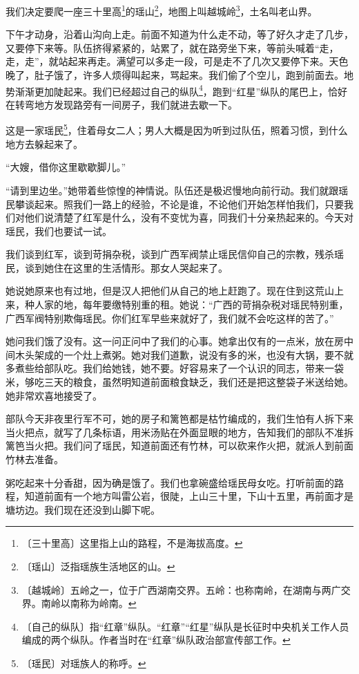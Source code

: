 \documentclass[12pt,UTF-8,openany]{ctexbook}
\begin{document}
\begin{large}
    
    我们决定要爬一座三十里高\footnote{〔三十里高〕这里指上山的路程，不是海拔高度。}的瑶山\footnote{〔瑶山〕泛指瑶族生活地区的山。}，地图上叫越城岭\footnote{〔越城岭〕五岭之一，位于广西湖南交界。五岭：也称南岭，在湖南与两广交界。南岭以南称为岭南。}，土名叫老山界。
    
    下午才动身，沿着山沟向上走。前面不知道为什么走不动，等了好久才走了几步，又要停下来等。队伍挤得紧紧的，站累了，就在路旁坐下来，等前头喊着“走，走，走”，就站起来再走。满望可以多走一段，可是走不了几次又要停下来。天色晚了，肚子饿了，许多人烦得叫起来，骂起来。我们偷了个空儿，跑到前面去。地势渐渐更加陡起来。我们已经超过自己的纵队\footnote{〔自己的纵队〕指“红章”纵队。“红章”“红星”纵队是长征时中央机关工作人员编成的两个纵队。作者当时在“红章”纵队政治部宣传部工作。}，跑到“红星”纵队的尾巴上，恰好在转弯地方发现路旁有一间房子，我们就进去歇一下。
    
    这是一家瑶民\footnote{〔瑶民〕对瑶族人的称呼。}，住着母女二人；男人大概是因为听到过队伍，照着习惯，到什么地方去躲起来了。
    
    “大嫂，借你这里歇歇脚儿。”
    
    “请到里边坐。”她带着些惊惶的神情说。队伍还是极迟慢地向前行动。我们就跟瑶民攀谈起来。照我们一路上的经验，不论是谁，不论他们开始怎样怕我们，只要我们对他们说清楚了红军是什么，没有不变忧为喜，同我们十分亲热起来的。今天对瑶民，我们也要试一试。
    
    我们谈到红军，谈到苛捐杂税，谈到广西军阀禁止瑶民信仰自己的宗教，残杀瑶民，谈到她住在这里的生活情形。那女人哭起来了。
    
    她说她原来也有过地，但是汉人把他们从自己的地上赶跑了。现在住到这荒山上来，种人家的地，每年要缴特别重的租。她说：“广西的苛捐杂税对瑶民特别重，广西军阀特别欺侮瑶民。你们红军早些来就好了，我们就不会吃这样的苦了。”
    
    她问我们饿了没有。这一问正问中了我们的心事。她拿出仅有的一点米，放在房中间木头架成的一个灶上煮粥。她对我们道歉，说没有多的米，也没有大锅，要不就多煮些给部队吃。我们给她钱，她不要。好容易来了一个认识的同志，带来一袋米，够吃三天的粮食，虽然明知道前面粮食缺乏，我们还是把这整袋子米送给她。她非常欢喜地接受了。
    
    部队今天非夜里行军不可，她的房子和篱笆都是枯竹编成的，我们生怕有人拆下来当火把点，就写了几条标语，用米汤贴在外面显眼的地方，告知我们的部队不准拆篱笆当火把。我们问了瑶民，知道前面还有竹林，可以砍来作火把，就派人到前面竹林去准备。
    
    粥吃起来十分香甜，因为确是饿了。我们也拿碗盛给瑶民母女吃。打听前面的路程，知道前面有一个地方叫雷公岩，很陡，上山三十里，下山十五里，再前面才是塘坊边。我们现在还没到山脚下呢。
    

\end{large}
\end{document}
